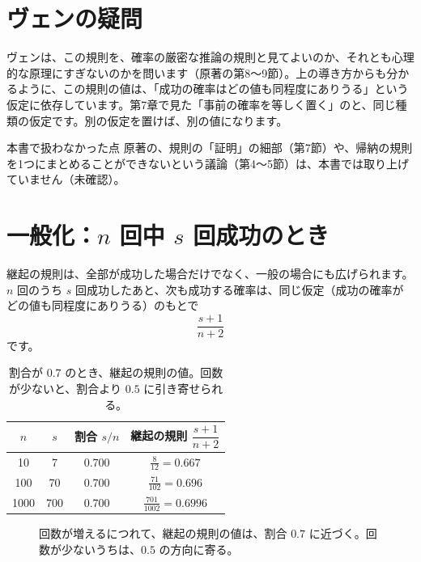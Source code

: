 \documentclass[a4paper,11pt,openany]{ltjsbook}
\begin{document}
\section{ヴェンの疑問}

ヴェンは、この規則を、確率の厳密な推論の規則と見てよいのか、それとも心理的な原理にすぎないのかを問います（原著の第8〜9節）。上の導き方からも分かるように、この規則の値は、「成功の確率はどの値も同程度にありうる」という仮定に依存しています。第7章で見た「事前の確率を等しく置く」のと、同じ種類の仮定です。別の仮定を置けば、別の値になります。

\begin{notebox}{本書で扱わなかった点}
原著の、規則の「証明」の細部（第7節）や、帰納の規則を1つにまとめることができないという議論（第4〜5節）は、本書では取り上げていません（未確認）。
\end{notebox}

\section{一般化：$n$ 回中 $s$ 回成功のとき}

継起の規則は、全部が成功した場合だけでなく、一般の場合にも広げられます。$n$ 回のうち $s$ 回成功したあと、次も成功する確率は、同じ仮定（成功の確率がどの値も同程度にありうる）のもとで
\[
\frac{s+1}{n+2}
\]
です。

\begin{table}[htbp]
\centering
\begin{tabular}{cc|cc}
\toprule
$n$ & $s$ & 割合 $s/n$ & 継起の規則 $\dfrac{s+1}{n+2}$\\
\midrule
10 & 7 & 0.700 & $\tfrac{8}{12}=0.667$\\
100 & 70 & 0.700 & $\tfrac{71}{102}=0.696$\\
1000 & 700 & 0.700 & $\tfrac{701}{1002}=0.6996$\\
\bottomrule
\end{tabular}
\caption{割合が $0.7$ のとき、継起の規則の値。回数が少ないと、割合より $0.5$ に引き寄せられる。}
\end{table}

\begin{figure}[htbp]
\centering
{}
\caption{回数が増えるにつれて、継起の規則の値は、割合 $0.7$ に近づく。回数が少ないうちは、$0.5$ の方向に寄る。}
\end{figure}
\end{document}
